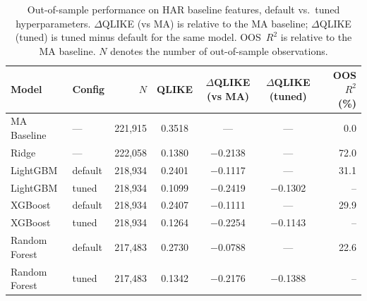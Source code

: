 \begin{table}[H]
\centering
\caption{Out-of-sample performance on HAR baseline features, default vs.\ tuned hyperparameters. $\Delta$QLIKE (vs MA) is relative to the MA baseline; $\Delta$QLIKE (tuned) is tuned minus default for the same model. OOS~$R^2$ is relative to the MA baseline. $N$ denotes the number of out-of-sample observations.}
\label{tab:model_comparison}
\begin{tabular}{llrcccr}
\toprule
Model & Config & $N$ & QLIKE & $\Delta$QLIKE (vs MA) & $\Delta$QLIKE (tuned) & OOS $R^2$ (\%) \\
\midrule
MA Baseline   & ---     & 221{,}915 & 0.3518 & ---       & ---       & 0.0 \\
Ridge         & ---     & 222{,}058 & 0.1380 & $-$0.2138 & ---       & 72.0 \\
\midrule
LightGBM      & default & 218{,}934 & 0.2401 & $-$0.1117 & ---       & 31.1 \\
LightGBM      & tuned   & 218{,}934 & 0.1099 & $-$0.2419 & $-$0.1302 & --   \\
XGBoost       & default & 218{,}934 & 0.2407 & $-$0.1111 & ---       & 29.9 \\
XGBoost       & tuned   & 218{,}934 & 0.1264 & $-$0.2254 & $-$0.1143 & --   \\
Random Forest & default & 217{,}483 & 0.2730 & $-$0.0788 & ---       & 22.6 \\
Random Forest & tuned   & 217{,}483 & 0.1342 & $-$0.2176 & $-$0.1388 & --   \\
\bottomrule
\end{tabular}
\end{table}

